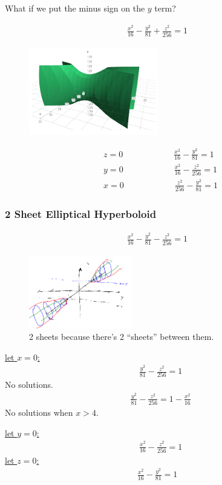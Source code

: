 \documentclass{article}
\begin{document}
What if we put the minus sign on the $y$ term?

\begin{align*}
  \frac{x^2}{16}-\frac{y^2}{81}+\frac{z^2}{256}=1
\end{align*}
\begin{figure}
  \includegraphics[width=0.5\textwidth]{hyperboloid2.png}
  \label{fig:hyperbola2}
\end{figure}
\begin{align*}
  &z=0\qquad\qquad\qquad\frac{x^2}{16}-\frac{y^2}{81}=1\\
  &y=0\qquad\qquad\qquad\frac{x^2}{16}-\frac{z^2}{256}=1\\
  &x=0\qquad\qquad\qquad\frac{z^2}{256}-\frac{y^2}{81}=1
\end{align*}

\newpage
\subsubsection{2 Sheet Elliptical Hyperboloid}

\begin{align*}
  \frac{x^2}{16}-\frac{y^2}{81}-\frac{z^2}{256}=1
\end{align*}
\begin{figure}[H]
    \includegraphics[width=0.4\textwidth, center]{hyperboloid3.png}
  \caption{2 sheets because there's 2 ``sheets'' between them.}
  \label{fig:hyperbola3}
\end{figure}
\begin{flushleft}
  \underline{let $x=0$:}
  \begin{align*}
    &\frac{y^2}{81}-\frac{z^2}{256}=1
  \end{align*}
  No solutions.
  \begin{align*}
    &\frac{y^2}{81}-\frac{z^2}{256}=1-\frac{x^2}{16}
  \end{align*}
  No solutions when $x>4$.

  \underline{let $y=0$:}
  \begin{align*}
    &\frac{x^2}{16}-\frac{z^2}{256}=1
  \end{align*}
  \underline{let $z=0$:}
  \begin{align*}
    \frac{x^2}{16}-\frac{y^2}{81}=1
  \end{align*}
\end{flushleft}
\end{document}
